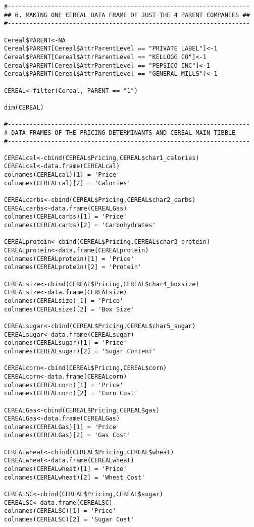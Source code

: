 \documentclass[12pt,english]{article}
\begin{document}
\begin{lstlisting}
#-------------------------------------------------------------------
## 6. MAKING ONE CEREAL DATA FRAME OF JUST THE 4 PARENT COMPANIES ##
#-------------------------------------------------------------------

Cereal$PARENT<-NA
Cereal$PARENT[Cereal$AttrParentLevel == "PRIVATE LABEL"]<-1
Cereal$PARENT[Cereal$AttrParentLevel == "KELLOGG CO"]<-1 
Cereal$PARENT[Cereal$AttrParentLevel == "PEPSICO INC"]<-1 
Cereal$PARENT[Cereal$AttrParentLevel == "GENERAL MILLS"]<-1

CEREAL<-filter(Cereal, PARENT == "1")  

dim(CEREAL)

#-------------------------------------------------------------------
# DATA FRAMES OF THE PRICING DETERMINANTS AND CEREAL MAIN TIBBLE
#-------------------------------------------------------------------

CEREALcal<-cbind(CEREAL$Pricing,CEREAL$char1_calories)
CEREALcal<-data.frame(CEREALcal)
colnames(CEREALcal)[1] = 'Price'
colnames(CEREALcal)[2] = 'Calories'

CEREALcarbs<-cbind(CEREAL$Pricing,CEREAL$char2_carbs)
CEREALcarbs<-data.frame(CEREALGas)
colnames(CEREALcarbs)[1] = 'Price'
colnames(CEREALcarbs)[2] = 'Carbohydrates'

CEREALprotein<-cbind(CEREAL$Pricing,CEREAL$char3_protein)
CEREALprotein<-data.frame(CEREALprotein)
colnames(CEREALprotein)[1] = 'Price'
colnames(CEREALprotein)[2] = 'Protein'

CEREALsize<-cbind(CEREAL$Pricing,CEREAL$char4_boxsize)
CEREALsize<-data.frame(CEREALsize)
colnames(CEREALsize)[1] = 'Price'
colnames(CEREALsize)[2] = 'Box Size'

CEREALsugar<-cbind(CEREAL$Pricing,CEREAL$char5_sugar)
CEREALsugar<-data.frame(CEREALsugar)
colnames(CEREALsugar)[1] = 'Price'
colnames(CEREALsugar)[2] = 'Sugar Content'

CEREALcorn<-cbind(CEREAL$Pricing,CEREAL$corn)
CEREALcorn<-data.frame(CEREALcorn)
colnames(CEREALcorn)[1] = 'Price'
colnames(CEREALcorn)[2] = 'Corn Cost'

CEREALGas<-cbind(CEREAL$Pricing,CEREAL$gas)
CEREALGas<-data.frame(CEREALGas)
colnames(CEREALGas)[1] = 'Price'
colnames(CEREALGas)[2] = 'Gas Cost'

CEREALwheat<-cbind(CEREAL$Pricing,CEREAL$wheat)
CEREALwheat<-data.frame(CEREALwheat)
colnames(CEREALwheat)[1] = 'Price'
colnames(CEREALwheat)[2] = 'Wheat Cost'

CEREALSC<-cbind(CEREAL$Pricing,CEREAL$sugar)
CEREALSC<-data.frame(CEREALSC)
colnames(CEREALSC)[1] = 'Price'
colnames(CEREALSC)[2] = 'Sugar Cost'


\end{lstlisting}
\end{document}
